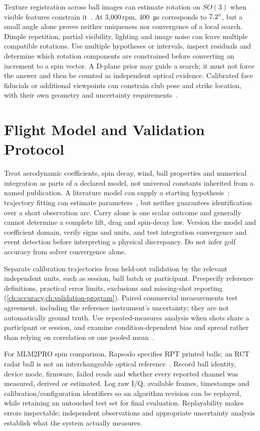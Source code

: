 Texture registration across ball images can estimate rotation on $SO(3)$ when visible features constrain it~\cite{us7292711,foresightspherical}.
At 3,000\,rpm, \SI{400}{\micro\second} corresponds to $7.2\si{\degree}$, but a small angle alone proves neither uniqueness nor convergence of a local search.
Dimple repetition, partial visibility, lighting and image noise can leave multiple compatible rotations.
Use multiple hypotheses or intervals, inspect residuals and determine which rotation components are constrained before converting an increment to a spin vector.
A D-plane prior may guide a search; it must not force the answer and then be counted as independent optical evidence.
Calibrated face fiducials or additional viewpoints can constrain club pose and strike location, with their own geometry and uncertainty requirements~\cite{us5501463,us6758759}.

\section{Flight Model and Validation Protocol}

Treat aerodynamic coefficients, spin decay, wind, ball properties and numerical integration as parts of a declared model, not universal constants inherited from a named publication.
A literature model can supply a starting hypothesis~\cite{smitssmith}; trajectory fitting can estimate parameters~\cite{us6186002}, but neither guarantees identification over a short observation arc.
Carry alone is one scalar outcome and generally cannot determine a complete lift, drag and spin-decay law.
Version the model and coefficient domain, verify signs and units, and test integration convergence and event detection before interpreting a physical discrepancy.
Do not infer golf accuracy from solver convergence alone.

Separate calibration trajectories from held-out validation by the relevant independent units, such as session, ball batch or participant.
Prespecify reference definitions, practical error limits, exclusions and missing-shot reporting (\cref{ch:accuracy,ch:validation-program}).
Paired commercial measurements test agreement, including the reference instrument's uncertainty; they are not automatically ground truth.
Use repeated-measures analysis when shots share a participant or session, and examine condition-dependent bias and spread rather than relying on correlation or one pooled mean~\cite{blandaltman2007}.

For MLM2PRO spin comparison, Rapsodo specifies RPT printed balls; an RCT radar ball is not an interchangeable optical reference~\cite{rapsodomlm2prorpt}.
Record ball identity, device mode, firmware, failed reads and whether every reported channel was measured, derived or estimated.
Log raw I/Q, available frames, timestamps and calibration/configuration identifiers so an algorithm revision can be replayed, while retaining an untouched test set for final evaluation.
Replayability makes errors inspectable; independent observations and appropriate uncertainty analysis establish what the system actually measures.

\nocite{trackmanballflightlaws,trackmanspinpatentblog,tutelmansmash}
